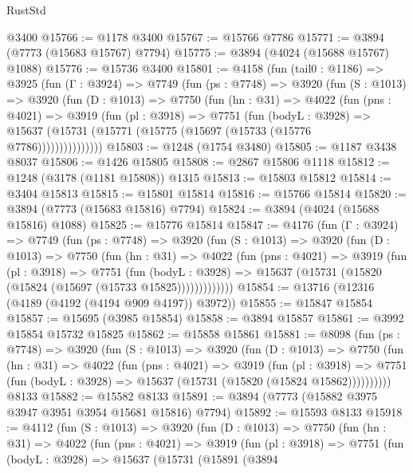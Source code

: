 \begin{lexlean}{RustStd}
\begin{coremodule}
    @3400
@15766 := @1178 @3400
@15767 := @15766 @7786
@15771 := @3894 (@7773 (@15683 @15767) @7794)
@15775 := @3894 (@4024 (@15688 @15767) @1088)
@15776 := @15736 @3400
@15801 := @4158
    (fun (tail0 : @1186) =>
    @3925
      (fun (Γ : @3924) =>
      @7749
        (fun (ps : @7748) =>
        @3920
          (fun (S : @1013) =>
          @3920
            (fun (D : @1013) =>
            @7750
              (fun (hn : @31) =>
              @4022
                (fun (pns : @4021) =>
                @3919
                  (fun (pl : @3918) =>
                  @7751
                    (fun (bodyL : @3928) =>
                    @15637 (@15731 (@15771 (@15775 (@15697 (@15733 (@15776 @7786)))))))))))))))
@15803 := @1248 (@1754 @3480)
@15805 := @1187 @3438 @8037
@15806 := @1426 @15805
@15808 := @2867 @15806 @1118
@15812 := @1248 (@3178 (@1181 @15808)) @1315
@15813 := @15803 @15812
@15814 := @3404 @15813
@15815 := @15801 @15814
@15816 := @15766 @15814
@15820 := @3894 (@7773 (@15683 @15816) @7794)
@15824 := @3894 (@4024 (@15688 @15816) @1088)
@15825 := @15776 @15814
@15847 := @4176
    (fun (Γ : @3924) =>
    @7749
      (fun (ps : @7748) =>
      @3920
        (fun (S : @1013) =>
        @3920
          (fun (D : @1013) =>
          @7750
            (fun (hn : @31) =>
            @4022
              (fun (pns : @4021) =>
              @3919
                (fun (pl : @3918) =>
                @7751
                  (fun (bodyL : @3928) =>
                  @15637 (@15731 (@15820 (@15824 (@15697 (@15733 @15825)))))))))))))
@15854 := @13716 (@12316 (@4189 (@4192 (@4194 @909 @4197)) @3972))
@15855 := @15847 @15854
@15857 := @15695 (@3985 @15854)
@15858 := @3894 @15857
@15861 := @3992 @15854 @15732 @15825
@15862 := @15858 @15861
@15881 := @8098
    (fun (ps : @7748) =>
    @3920
      (fun (S : @1013) =>
      @3920
        (fun (D : @1013) =>
        @7750
          (fun (hn : @31) =>
          @4022
            (fun (pns : @4021) =>
            @3919
              (fun (pl : @3918) =>
              @7751 (fun (bodyL : @3928) => @15637 (@15731 (@15820 (@15824 @15862))))))))))
    @8133
@15882 := @15582 @8133
@15891 := @3894 (@7773 (@15882 @3975 @3947 @3951 @3954 @15681 @15816) @7794)
@15892 := @15593 @8133
@15918 := @4112
    (fun (S : @1013) =>
    @3920
      (fun (D : @1013) =>
      @7750
        (fun (hn : @31) =>
        @4022
          (fun (pns : @4021) =>
          @3919
            (fun (pl : @3918) =>
            @7751
              (fun (bodyL : @3928) =>
              @15637
                (@15731
                  (@15891
                    (@3894

\end{coremodule}
\end{lexlean}
